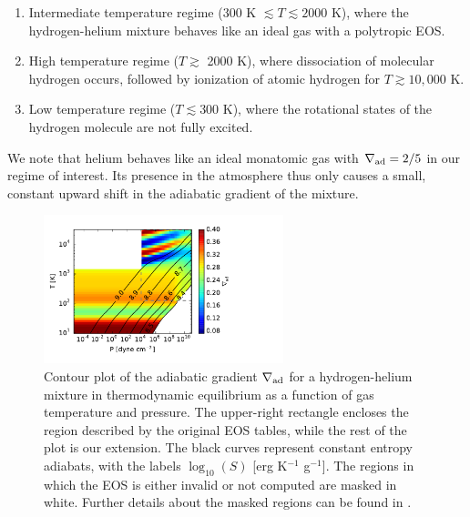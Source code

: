 \begin{enumerate}
\item Intermediate temperature regime (300 K $\lesssim T \lesssim 2000$ K), where the hydrogen-helium mixture behaves like an ideal gas with a polytropic EOS.
\item High temperature regime ($T \gtrsim$ 2000 K), where dissociation of molecular hydrogen occurs, followed by ionization of atomic hydrogen for $T \gtrsim 10,000$ K.
\item Low temperature regime ($T \lesssim 300$ K), where the rotational states of the hydrogen molecule are not fully excited. %
\end{enumerate}

We note that helium behaves like an ideal monatomic gas with $\nabla_{\rm ad}=2/5$ in our regime of interest.  Its presence in the atmosphere thus only causes a small, constant upward shift in the adiabatic gradient of the mixture.

\begin{figure}[htb]
\centering
\includegraphics[width=0.62\textwidth]{figures/delad_S_mixt.pdf}
\caption{Contour plot of the adiabatic gradient $\nabla_{\rm ad}$ for a hydrogen-helium mixture in thermodynamic equilibrium as a function of gas temperature and pressure. The upper-right rectangle encloses the region described by the original \citet{saumon95} EOS tables, while the rest of the plot is our extension. The black curves represent constant entropy adiabats, with the labels $\log_{10}(S)$ [erg K$^{-1}$ g$^{-1}$]. The regions in which the EOS is either invalid or not computed are masked in white. Further details about the masked regions can be found in .}
\label{fig:deladmap}
\end{figure}

